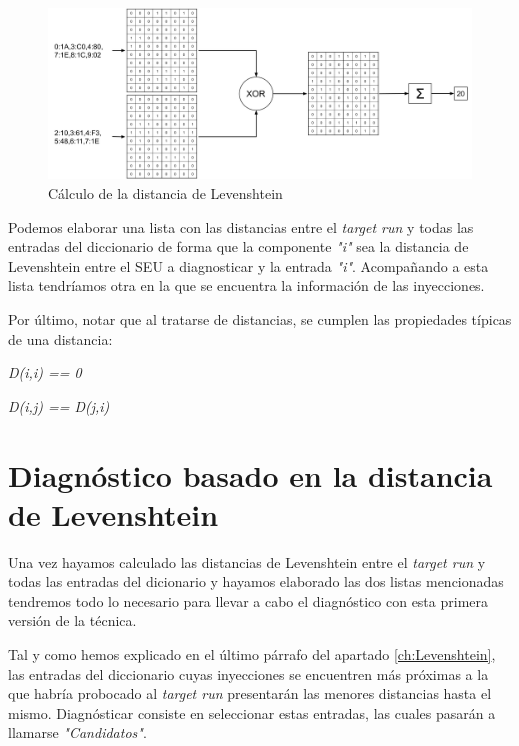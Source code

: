 \begin{figure}[htbp]
    \centering
    \includegraphics[width=0.95\linewidth]
    {Levenshtein/figuras/fig41.png}
    \caption{Cálculo de la distancia de Levenshtein}
    \label{fig:LevenDist}
\end{figure}

Podemos elaborar una lista con las distancias entre el \textit{target run} y 
todas las entradas del diccionario de forma que la componente \textit{"i"} sea 
la distancia de Levenshtein entre el \gls{SEU} a diagnosticar y la entrada 
\textit{"i"}. Acompañando a esta lista tendríamos otra en la que se encuentra la
información de las inyecciones. 

Por último, notar que al tratarse de distancias, se cumplen las propiedades
típicas de una distancia: 
\begin{center}
    \textit{D(i,i) == 0}

    \textit{D(i,j) == D(j,i)}
\end{center}

\section{Diagnóstico basado en la distancia de Levenshtein}
\label{sec:LevenCands}
Una vez hayamos calculado las distancias de Levenshtein entre el \textit{target
run} y todas las entradas del dicionario y hayamos elaborado las dos listas
mencionadas tendremos todo lo necesario para llevar a cabo el diagnóstico con esta
primera versión de la técnica. 

Tal y como hemos explicado en el último párrafo del apartado \ref{ch:Levenshtein},
las entradas del diccionario cuyas inyecciones se encuentren más próximas a la
que habría probocado al \textit{target run} presentarán las menores distancias
hasta el mismo. Diagnósticar consiste en seleccionar estas entradas, las cuales
pasarán a llamarse \textit{"Candidatos"}.

